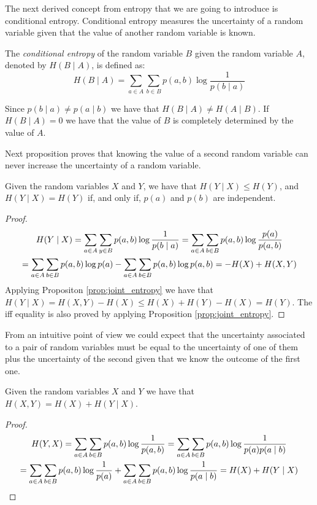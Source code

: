 
The next derived concept from entropy that we are going to introduce is conditional entropy. Conditional entropy measures the uncertainty of a random variable given that the value of another random variable is known.

\begin{definition}
The \emph{conditional entropy} of the random variable $B$ given the random variable $A$, denoted by $H(B \mid A)$, is defined as:
\[
H(B \mid A) = \sum_{a \in A} \sum_{b \in B} p(a, b) \log \frac{1}{p(b \mid a)}
\]
\end{definition}

Since $p(b \mid a) \neq p(a \mid b)$ we have that $H(B \mid A) \neq H(A \mid B)$. If $H(B \mid A) = 0$ we have that the value of $B$ is completely determined by the value of $A$.

Next proposition proves that knowing the value of a second random variable can never increase the uncertainty of a random variable.

\begin{proposition}
Given the random variables $X$ and $Y$, we have that $H(Y \mid X) \leq H(Y)$, and $H(Y \mid X) = H(Y)$ if, and only if, $p(a)$ and $p(b)$ are independent.
\end{proposition}
\begin{proof}
\begin{multline}
H(Y \mid X) = \sum_{a \in A} \sum_{y \in B} p(a, b) \log \frac{1}{p(b \mid a)} = \sum_{a \in A} \sum_{b \in B} p(a, b) \log \frac{p(a)}{p(a, b)} \\
\notag = \sum_{a \in A} \sum_{b \in B} p(a, b) \log p(a) - \sum_{a \in A} \sum_{b \in B} p(a, b) \log p(a, b) = -H(X) + H(X, Y)
\end{multline}
Applying Propositon \ref{prop:joint_entropy} we have that $H(Y \mid X) = H(X, Y) - H(X) \leq H(X) + H(Y) - H(X) = H(Y)$.
The iff equality is also proved by applying Proposition \ref{prop:joint_entropy}.
\end{proof}

From an intuitive point of view we could expect that the uncertainty associated to a pair of random variables must be equal to the uncertainty of one of them plus the uncertainty of the second given that we know the outcome of the first one.

\begin{proposition}
\label{prop:chain_rule_entropy}
Given the random variables $X$ and $Y$ we have that $H(X, Y) = H(X) + H(Y \mid X)$.
\end{proposition}
\begin{proof}
\begin{multline}
H(Y, X) = \sum_{a \in A} \sum_{b \in B} p(a, b) \log \frac{1}{p(a, b)} = \sum_{a \in A} \sum_{b \in B} p(a, b) \log \frac{1}{p(a) p(a \mid b)} \\
\notag = \sum_{a \in A} \sum_{b \in B} p(a, b) \log \frac{1}{p(a)} + \sum_{a \in A} \sum_{b \in B} p(a, b) \log \frac{1}{p(a \mid b)} = H(X) + H(Y \mid X)
\end{multline}
\end{proof}

